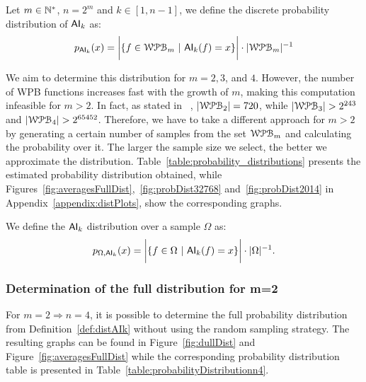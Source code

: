 \documentclass[11pt]{llncs}
\begin{document}
\begin{definition}\label{def:distAIk}
    Let $m \in \mathbb{N}^*$, $n = 2^m$ and $k \in [1,n-1]$, we define the discrete probability distribution of $\mathsf{AI}_{k}$ as:
\[p_{\mathsf{AI}_{k}}(x) = \bigg|\{f\in \mathcal{WPB}_{m}\  |\  \mathsf{AI}_{k}(f) = x\}\bigg| \cdot |\mathcal{WPB}_{m}|^{-1}\]
\end{definition}

We aim to determine this distribution for $m = 2, 3$, and $4$. 
However, the number of WPB functions increases fast with the growth of $m$, making this computation infeasible for $m > 2$. In fact, as stated in ~\cite{Latin:GinMea23}, $|\mathcal{WPB}_{2}| = 720$, while $|\mathcal{WPB}_{3}| > 2^{243}$ and $|\mathcal{WPB}_{4}| > 2^{65452}$.
Therefore, we have to take a different approach for $m > 2$ by generating a certain number of samples from the set $\mathcal{WPB}_{m}$ and calculating the probability over it. The larger the sample size we select, the better we approximate the distribution. 
Table~\ref{table:probability_distributions} presents the estimated probability distribution obtained, while Figures~\ref{fig:averagesFullDist},~\ref{fig:probDist32768} and~\ref{fig:probDist2014} in Appendix~\ref{appendix:distPlots}, show the corresponding graphs.

\begin{definition}
    We define the $\mathsf{AI}_{k}$ distribution over a sample $\Omega$ as:
\[
 p_{\Omega,\mathsf{AI}_{k} }(x) =  \bigg|\{f\in \Omega\ | \  \mathsf{AI}_{k}(f) = x\}\bigg| \cdot |\Omega|^{-1}.\]
\end{definition}


\subsubsection{Determination of the full distribution for \texorpdfstring{m=2}{m=2}}
For $m=2 \Rightarrow n = 4$, it is possible to determine the full probability distribution from Definition~\ref{def:distAIk} without using the random sampling strategy. 
The resulting graphs can be found in Figure~\ref{fig:dullDist} and Figure~\ref{fig:averagesFullDist} while the corresponding probability distribution table is presented in Table~\ref{table:probabilityDistributionn4}. 
\end{document}
